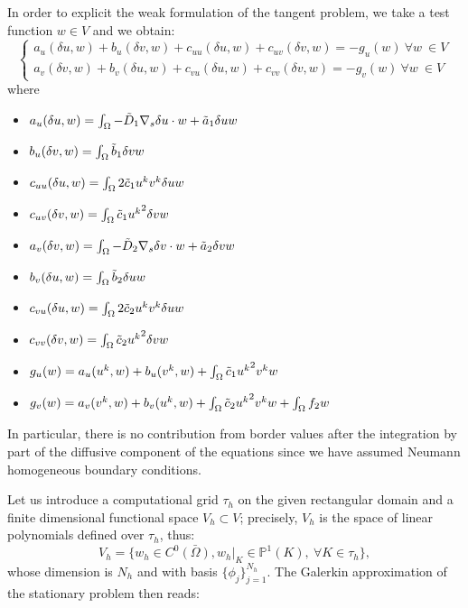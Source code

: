 In order to explicit the weak formulation of the tangent problem, we take a test function $w \in V$ and we obtain:
\begin{equation}\label{eq:weak_newton}
\left\lbrace
\begin{matrix}
  a_u(\delta u, w) + b_u(\delta v, w) + c_{uu}(\delta u, w) + c_{uv}(\delta v, w) = - g_u(w) \ \forall w \ \in V \\
  a_v(\delta v, w) + b_v(\delta u, w) + c_{vu}(\delta u, w) + c_{vv}(\delta v, w) = - g_v(w) \ \forall w \ \in V
\end{matrix}
\right.
\end{equation}
where
\begin{itemize}
    \item $a_u(\delta u, w) = \int_{\Omega} - \Tilde{D}_1 \nabla_s \delta u \cdot w + \Tilde{a}_1 \delta u w $
    \item $b_u(\delta v, w) = \int_{\Omega} \Tilde{b}_1 \delta v w$
    \item $ c_{uu}(\delta u, w) = \int_{\Omega} 2 \Tilde{c}_1 u^k v^k \delta u w$
    \item $ c_{uv}(\delta v, w) = \int_{\Omega} \Tilde{c}_1 {u^k}^2 \delta v w$
    \item $a_v(\delta v, w) = \int_{\Omega} - \Tilde{D}_2 \nabla_s \delta v \cdot w + \Tilde{a}_2 \delta v w $
    \item $b_v(\delta u, w) = \int_{\Omega} \Tilde{b}_2 \delta u w$
    \item $ c_{vu}(\delta u, w) = \int_{\Omega} 2 \Tilde{c}_2 u^k v^k \delta u w$
    \item $ c_{v
    v}(\delta v, w) = \int_{\Omega} \Tilde{c}_2 {u^k}^2 \delta v w$
    \item $g_u(w) = a_u(u^k,w) + b_u(v^k,w) + \int_{\Omega} \Tilde{c}_1 {u^k}^2 v^k w $
    \item $g_v(w) = a_v(v^k,w) + b_v(u^k,w) + \int_{\Omega} \Tilde{c}_2 {u^k}^2 v^k w + \int_{\Omega} f_2 w$
\end{itemize}

In particular, there is no contribution from border values after the integration by part of the diffusive component of the equations since we have assumed Neumann homogeneous boundary conditions.

Let us introduce a computational grid $\tau_h$ on the given rectangular domain and a finite dimensional functional space $V_h \subset V$; precisely, $V_h$ is the space of linear polynomials defined over $\tau_h$, thus:
\begin{equation}\label{eq:fespace}
  V_h = \{ w_h \in C^0\bar{\left(\Omega\right)}, w_h|_{K} \in \mathbb{P}^1\left(K\right), \ \forall K \in \tau_h\},
\end{equation}
whose  dimension is $N_h$ and with basis $\{\phi_j \}_{j=1}^{N_h}$. The Galerkin approximation of the stationary problem then reads:


